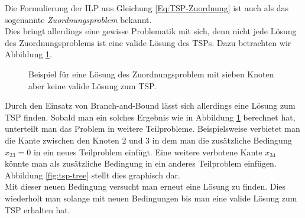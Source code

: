 \documentclass[tog]{acmsiggraph}
\begin{document}
Die Formulierung der ILP aus Gleichung \ref{Eq:TSP-Zuordnung} ist auch als das sogenannte \textit{Zuordnungsproblem} bekannt.\\
Dies bringt allerdings eine gewisse Problematik mit sich, denn nicht jede Lösung des Zuordnungsproblems ist eine valide Lösung des TSPs. Dazu betrachten wir Abbildung \ref{fig:tsp-result}.

\begin{figure}[ht]
\centering
{}
\caption{Beispiel für eine Lösung des Zuordnungsproblem mit sieben Knoten aber keine valide Lösung zum TSP.}
\label{fig:tsp-result}
\end{figure}

Durch den Einsatz von Branch-and-Bound lässt sich allerdings eine Lösung zum TSP finden. Sobald man ein solches Ergebnis wie in Abbildung \ref{fig:tsp-result} berechnet hat, unterteilt man das Problem in weitere Teilprobleme. Beispielsweise verbietet man die Kante zwischen den Knoten $2$ und $3$ in dem man die zusätzliche Bedingung $x_{23} = 0$ in ein neues Teilproblem einfügt. Eine weitere verbotene Kante $x_{34}$ könnte man als zusätzliche Bedingung in ein anderes Teilproblem einfügen. Abbildung \ref{fig:tsp-tree} stellt dies graphisch dar.\\
Mit dieser neuen Bedingung versucht man erneut eine Lösung zu finden. Dies wiederholt man solange mit neuen Bedingungen bis man eine valide Lösung zum TSP erhalten hat.
\end{document}
